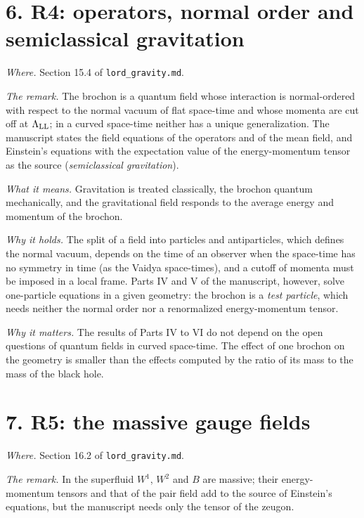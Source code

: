 \documentclass[
  10pt,
]{article}
\begin{document}
\hypertarget{r4-operators-normal-order-and-semiclassical-gravitation}{%
\section{6. R4: operators, normal order and semiclassical
gravitation}\label{r4-operators-normal-order-and-semiclassical-gravitation}}

\emph{Where.} Section 15.4 of \texttt{lord\_gravity.md}.

\emph{The remark.} The brochon is a quantum field whose interaction is
normal-ordered with respect to the normal vacuum of flat space-time and
whose momenta are cut off at \(\Lambda_{\rm LL}\); in a curved
space-time neither has a unique generalization. The manuscript states
the field equations of the operators and of the mean field, and
Einstein's equations with the expectation value of the energy-momentum
tensor as the source (\emph{semiclassical gravitation}).

\emph{What it means.} Gravitation is treated classically, the brochon
quantum mechanically, and the gravitational field responds to the
average energy and momentum of the brochon.

\emph{Why it holds.} The split of a field into particles and
antiparticles, which defines the normal vacuum, depends on the time of
an observer when the space-time has no symmetry in time (as the Vaidya
space-times), and a cutoff of momenta must be imposed in a local frame.
Parts IV and V of the manuscript, however, solve one-particle equations
in a given geometry: the brochon is a \emph{test particle}, which needs
neither the normal order nor a renormalized energy-momentum tensor.

\emph{Why it matters.} The results of Parts IV to VI do not depend on
the open questions of quantum fields in curved space-time. The effect of
one brochon on the geometry is smaller than the effects computed by the
ratio of its mass to the mass of the black hole.

\hypertarget{r5-the-massive-gauge-fields}{%
\section{7. R5: the massive gauge
fields}\label{r5-the-massive-gauge-fields}}

\emph{Where.} Section 16.2 of \texttt{lord\_gravity.md}.

\emph{The remark.} In the superfluid \(W^1\), \(W^2\) and \(B\) are
massive; their energy-momentum tensors and that of the pair field add to
the source of Einstein's equations, but the manuscript needs only the
tensor of the zeugon.
\end{document}
